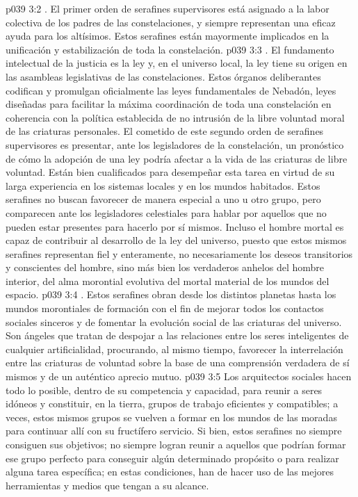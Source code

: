 \vs p039 3:2 . El primer orden de serafines supervisores está asignado a la labor colectiva de los padres de las constelaciones, y siempre representan una eficaz ayuda para los altísimos. Estos serafines están mayormente implicados en la unificación y estabilización de toda la constelación.
\vs p039 3:3 . El fundamento intelectual de la justicia es la ley y, en el universo local, la ley tiene su origen en las asambleas legislativas de las constelaciones. Estos órganos deliberantes codifican y promulgan oficialmente las leyes fundamentales de Nebadón, leyes diseñadas para facilitar la máxima coordinación de toda una constelación en coherencia con la política establecida de no intrusión de la libre voluntad moral de las criaturas personales. El cometido de este segundo orden de serafines supervisores es presentar, ante los legisladores de la constelación, un pronóstico de cómo la adopción de una ley podría afectar a la vida de las criaturas de libre voluntad. Están bien cualificados para desempeñar esta tarea en virtud de su larga experiencia en los sistemas locales y en los mundos habitados. Estos serafines no buscan favorecer de manera especial a uno u otro grupo, pero comparecen ante los legisladores celestiales para hablar por aquellos que no pueden estar presentes para hacerlo por sí mismos. Incluso el hombre mortal es capaz de contribuir al desarrollo de la ley del universo, puesto que estos mismos serafines representan fiel y enteramente, no necesariamente los deseos transitorios y conscientes del hombre, sino más bien los verdaderos anhelos del hombre interior, del alma morontial evolutiva del mortal material de los mundos del espacio.
\vs p039 3:4 . Estos serafines obran desde los distintos planetas hasta los mundos morontiales de formación con el fin de mejorar todos los contactos sociales sinceros y de fomentar la evolución social de las criaturas del universo. Son ángeles que tratan de despojar a las relaciones entre los seres inteligentes de cualquier artificialidad, procurando, al mismo tiempo, favorecer la interrelación entre las criaturas de voluntad sobre la base de una comprensión verdadera de sí mismos y de un auténtico aprecio mutuo.
\vs p039 3:5 Los arquitectos sociales hacen todo lo posible, dentro de su competencia y capacidad, para reunir a seres idóneos y constituir, en la tierra, grupos de trabajo eficientes y compatibles; a veces, estos mismos grupos se vuelven a formar en los mundos de las moradas para continuar allí con su fructífero servicio. Si bien, estos serafines no siempre consiguen sus objetivos; no siempre logran reunir a aquellos que podrían formar ese grupo perfecto para conseguir algún determinado propósito o para realizar alguna tarea específica; en estas condiciones, han de hacer uso de las mejores herramientas y medios que tengan a su alcance.
